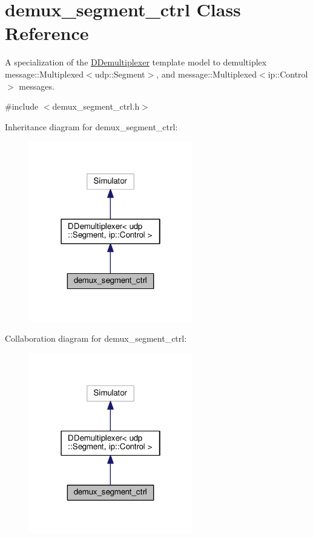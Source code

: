 \hypertarget{classdemux__segment__ctrl}{}\section{demux\+\_\+segment\+\_\+ctrl Class Reference}
\label{classdemux__segment__ctrl}


A specialization of the \hyperlink{classDDemultiplexer}{D\+Demultiplexer} template model to demultiplex message\+::\+Multiplexed$<$udp\+::\+Segment$>$, and message\+::\+Multiplexed$<$ip\+::\+Control$>$ messages.  




{\ttfamily \#include $<$demux\+\_\+segment\+\_\+ctrl.\+h$>$}



Inheritance diagram for demux\+\_\+segment\+\_\+ctrl\+:\nopagebreak
\begin{figure}[H]
\begin{center}
\leavevmode
\includegraphics[width=202pt]{classdemux__segment__ctrl__inherit__graph}
\end{center}
\end{figure}


Collaboration diagram for demux\+\_\+segment\+\_\+ctrl\+:\nopagebreak
\begin{figure}[H]
\begin{center}
\leavevmode
\includegraphics[width=202pt]{classdemux__segment__ctrl__coll__graph}
\end{center}
\end{figure}
